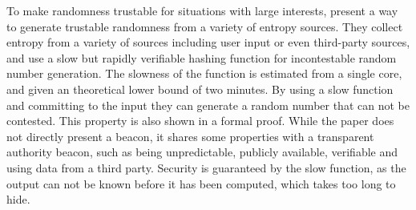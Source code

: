\item[A Random Zoo: sloth, unicorn \& trx]
To make randomness trustable for situations with large interests, \citet*{lenstra2015random} present a way to generate trustable randomness from a variety of entropy sources. They collect entropy from a variety of sources including user input or even third-party sources, and use a slow but rapidly verifiable hashing function for incontestable random number generation. The slowness of the function is estimated from a single core, and given an theoretical lower bound of two minutes. By using a slow function and committing to the input they can generate a random number that can not be contested. This property is also shown in a formal proof.  While the paper does not directly present a beacon, it shares some properties with a transparent authority beacon, such as being unpredictable, publicly available, verifiable and using data from a third party. Security is guaranteed by the slow function, as the output can not be known before it has been computed, which takes too long to hide.   %
